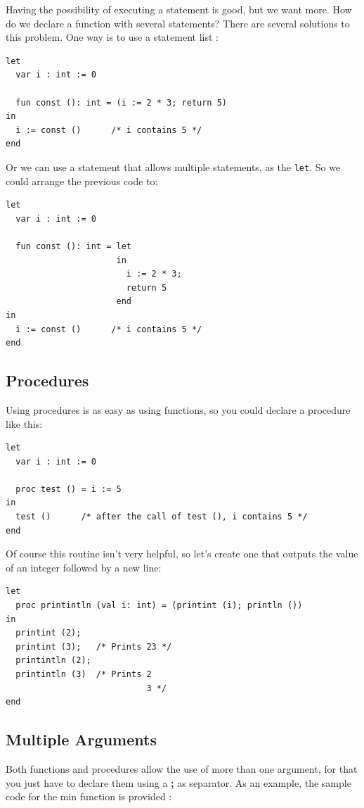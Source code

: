 \documentclass[a4paper, 11pt]{report}
\newcommand{\keyword}[1]{\texttt{#1}}
\begin{document}
Having the possibility of executing a statement is good, but we want more. How do
we declare a function with several statements? There are several solutions to this
problem. One way is to use a statement list :

\begin{lstlisting}
let
  var i : int := 0

  fun const (): int = (i := 2 * 3; return 5)
in
  i := const ()      /* i contains 5 */
end
\end{lstlisting}

Or we can use a statement that allows multiple statements, as the \keyword{let}. So
we could arrange the previous code to:

\begin{lstlisting}
let
  var i : int := 0

  fun const (): int = let
                      in
                        i := 2 * 3;
                        return 5
                      end
in
  i := const ()      /* i contains 5 */
end
\end{lstlisting}

\subsection{Procedures}

Using procedures is as easy as using functions, so you could declare a procedure like this:


\begin{lstlisting}
let
  var i : int := 0

  proc test () = i := 5
in
  test ()      /* after the call of test (), i contains 5 */
end
\end{lstlisting}

Of course this routine isn't very helpful, so let's create one that outputs the value of
an integer followed by a new line:

\begin{lstlisting}
let
  proc printintln (val i: int) = (printint (i); println ())
in
  printint (2);
  printint (3);   /* Prints 23 */
  printintln (2);
  printintln (3)  /* Prints 2
                            3 */
end
\end{lstlisting}

\subsection{Multiple Arguments}
Both functions and procedures allow the use of more than one argument,
for that you just have to declare them using a \textbf{;} as separator. As
an example, the sample code for the min function is provided :
\end{document}
